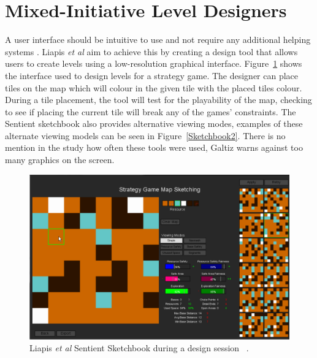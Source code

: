 \documentclass[journal]{IEEEtran}
\begin{document}
\section{Mixed-Initiative Level Designers } \label{UI}
A user interface should be intuitive to use and not require any additional helping systems \cite{oppermann2002user}. Liapis \textit{et al} \cite{liapis2013sentient} aim to achieve this by creating a design tool that allows users to create levels using a low-resolution graphical interface. Figure~\ref{Sketchbook} shows the interface used to design levels for a strategy game. The designer can place tiles on the map which will colour in the given tile with the placed tiles colour. During a tile placement, the tool will test for the playability of the map, checking to see if placing the current tile will break any of the games' constraints.  The Sentient sketchbook also provides alternative viewing modes, examples of these alternate viewing models can be seen in Figure~\ref{Sketchbook2}.  There is no mention in the study how often these tools were used, Galtiz \cite[p.~752]{galitz2007essential} warns against too many graphics on the screen.

\begin{figure}[h]
	\includegraphics[width=1.0\linewidth]{SentientSketchbook.PNG}
	\caption{Liapis \textit{et al} Sentient Sketchbook during a design session ~\cite{liapis2013sentient}.}
	\label{Sketchbook}
\end{figure} 
\end{document}
